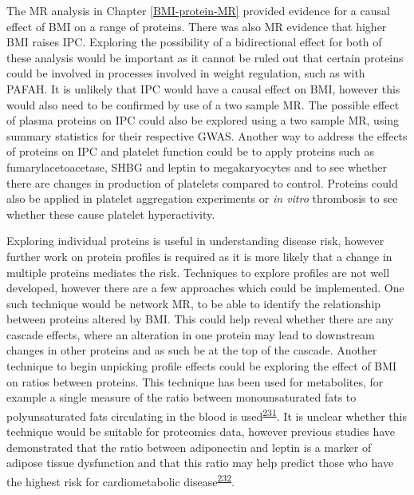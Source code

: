 \documentclass[11pt,twoside]{bristolthesis}
\begin{document}
The MR analysis in Chapter \ref{BMI-protein-MR} provided evidence for a causal effect of BMI on a range of proteins. There was also MR evidence that higher BMI raises IPC. Exploring the possibility of a bidirectional effect for both of these analysis would be important as it cannot be ruled out that certain proteins could be involved in processes involved in weight regulation, such as with PAFAH. It is unlikely that IPC would have a causal effect on BMI, however this would also need to be confirmed by use of a two sample MR. The possible effect of plasma proteins on IPC could also be explored using a two sample MR, using summary statistics for their respective GWAS. Another way to address the effects of proteins on IPC and platelet function could be to apply proteins such as fumarylacetoacetase, SHBG and leptin to megakaryocytes and to see whether there are changes in production of platelets compared to control. Proteins could also be applied in platelet aggregation experiments or \emph{in vitro} thrombosis to see whether these cause platelet hyperactivity.

Exploring individual proteins is useful in understanding disease risk, however further work on protein profiles is required as it is more likely that a change in multiple proteins mediates the risk. Techniques to explore profiles are not well developed, however there are a few approaches which could be implemented. One such technique would be network MR, to be able to identify the relationship between proteins altered by BMI. This could help reveal whether there are any cascade effects, where an alteration in one protein may lead to downstream changes in other proteins and as such be at the top of the cascade. Another technique to begin unpicking profile effects could be exploring the effect of BMI on ratios between proteins. This technique has been used for metabolites, for example a single measure of the ratio between monounsaturated fats to polyunsaturated fats circulating in the blood is used\textsuperscript{\protect\hyperlink{ref-Carayol2017c}{231}}. It is unclear whether this technique would be suitable for proteomics data, however previous studies have demonstrated that the ratio between adiponectin and leptin is a marker of adipose tissue dysfunction and that this ratio may help predict those who have the highest risk for cardiometabolic disease\textsuperscript{\protect\hyperlink{ref-Fruhbeck2019}{232}}.
\end{document}
